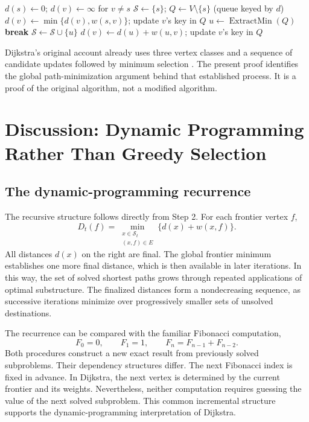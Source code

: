 \documentclass[11pt]{article}
\newcommand{\Sset}{\mathcal{S}_t}
\begin{document}
\begin{algorithm}[htbp]
\caption{Dijkstra's algorithm with the source settled initially}\label{alg:standard}
\begin{algorithmic}[1]
\State $d(s)\gets 0$; $d(v)\gets\infty$ for $v\ne s$
\State $\mathcal S\gets\{s\}$; $Q\gets V\setminus\{s\}$ (queue keyed by $d$)
  \State $d(v)\gets\min\{d(v),w(s,v)\}$; update $v$'s key in $Q$ 
\EndFor
{}
  \State $u\gets\operatorname{ExtractMin}(Q)$ 
   \State \textbf{break} \EndIf
  \State $\mathcal S\gets\mathcal S\cup\{u\}$
      \State $d(v)\gets d(u)+w(u,v)$; update $v$'s key in $Q$ 
    \EndIf
  \EndFor
\EndWhile
\end{algorithmic}
\end{algorithm}

Dijkstra's original account already uses three vertex classes and a sequence of candidate updates followed by minimum selection \cite{Dijkstra1959}. The present proof identifies the global path-minimization argument behind that established process. It is a proof of the original algorithm, not a modified algorithm.

\section{Discussion: Dynamic Programming Rather Than Greedy Selection}
\label{sec:discussion}
\subsection{The dynamic-programming recurrence}
The recursive structure follows directly from Step 2. For each frontier vertex $f$,
\[
 D_t(f)=\min_{\substack{x\in\Sset\\(x,f)\in E}}
 \{d(x)+w(x,f)\}.
\]
All distances $d(x)$ on the right are final. The global frontier minimum establishes one more final distance, which is then available in later iterations. In this way, the set of solved shortest paths grows through repeated applications of optimal substructure. The finalized distances form a nondecreasing sequence, as successive iterations minimize over progressively smaller sets of unsolved destinations.

The recurrence can be compared with the familiar Fibonacci computation,
\[
 F_0=0,\qquad F_1=1,\qquad F_n=F_{n-1}+F_{n-2}.
\]
Both procedures construct a new exact result from previously solved subproblems. Their dependency structures differ. The next Fibonacci index is fixed in advance. In Dijkstra, the next vertex is determined by the current frontier and its weights. Nevertheless, neither computation requires guessing the value of the next solved subproblem. This common incremental structure supports the dynamic-programming interpretation of Dijkstra.
\end{document}

